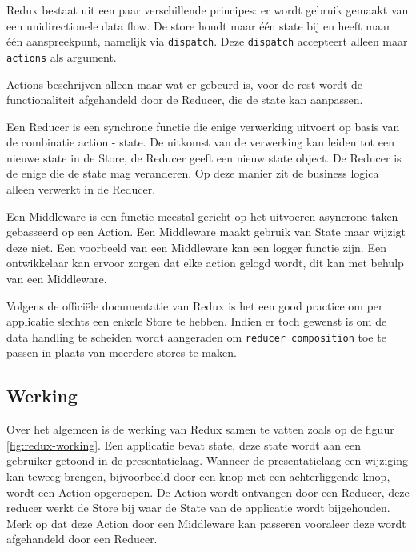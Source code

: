 Redux bestaat uit een paar verschillende principes: er wordt gebruik gemaakt van een unidirectionele data flow. De store houdt maar één state bij en heeft maar één aanspreekpunt, namelijk via \verb|dispatch|. Deze \verb|dispatch| accepteert alleen maar \verb|actions| als argument.

Actions beschrijven alleen maar wat er gebeurd is, voor de rest wordt de functionaliteit afgehandeld door de Reducer, die de state kan aanpassen.

Een Reducer is een synchrone functie die enige verwerking uitvoert op basis van de combinatie action - state. De uitkomst van de verwerking kan leiden tot een nieuwe state in de Store, de Reducer geeft een nieuw state object. De Reducer is de enige die de state mag veranderen. Op deze manier zit de business logica alleen verwerkt in de Reducer. 

Een Middleware is een functie meestal gericht op het uitvoeren asyncrone taken gebasseerd op een Action. Een Middleware maakt gebruik van State maar wijzigt deze niet. Een voorbeeld van een Middleware kan een logger functie zijn. Een ontwikkelaar kan ervoor zorgen dat elke action gelogd wordt, dit kan met behulp van een Middleware.

Volgens de officiële documentatie van Redux is het een good practice om per applicatie slechts een enkele Store te hebben. Indien er toch gewenst is om de data handling te scheiden wordt aangeraden om \verb|reducer composition| toe te passen in plaats van meerdere stores te maken.

\subsection{Werking}
Over het algemeen is de werking van Redux samen te vatten zoals op de figuur \ref{fig:redux-working}. Een applicatie bevat state, deze state wordt aan een gebruiker getoond in de presentatielaag. Wanneer de presentatielaag een wijziging kan teweeg brengen, bijvoorbeeld door een knop met een achterliggende knop, wordt een Action opgeroepen. De Action wordt ontvangen door een Reducer, deze reducer werkt de Store bij waar de State van de applicatie wordt bijgehouden. Merk op dat deze Action door een Middleware kan passeren vooraleer deze wordt afgehandeld door een Reducer.

